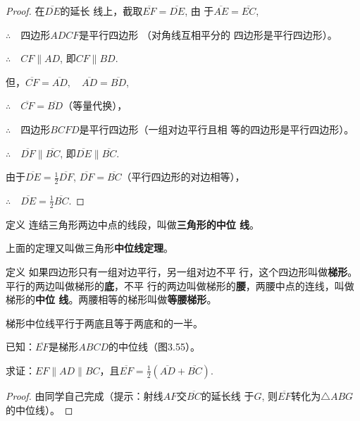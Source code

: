 \begin{proof}
 在$\overline{DE}$的延长
线上，截取$\overline{EF}=\overline{DE}$, 由
于$\overline{AE}=\overline{EC}$, 

$\therefore\quad $四边形$ADCF$是平行四边形
（对角线互相平分的
四边形是平行四边形）。

$\therefore\quad CF\parallel AD$, 即$CF\parallel BD$.

但，$\overline{CF}=\overline{AD},\quad \overline{AD}=\overline{BD}$,

$\therefore\quad \overline{CF}=\overline{BD}$（等量代换），

$\therefore\quad $四边形$BCFD$是平行四边形（一组对边平行且相
等的四边形是平行四边形）。

$\therefore\quad \overline{DF}\parallel \overline{BC}$, 即$\overline{DE}\parallel \overline{BC}$.

由于$\overline{DE}=\frac{1}{2}\overline{DF}$, $\overline{DF}=\overline{BC}$（平行四边形的对边相等），

$\therefore\quad \overline{DE}=\frac{1}{2}\overline{BC}$.
\end{proof}

\begin{blk}
    {定义}
连结三角形两边中点的线段，叫做\textbf{三角形的中位
线}。
\end{blk}

上面的定理又叫做三角形\textbf{中位线定理}。

\begin{blk}
    {定义} 如果四边形只有一组对边平行，另一组对边不平
行，这个四边形叫做\textbf{梯形}。平行的两边叫做梯形的\textbf{底}，不平
行的两边叫做梯形的\textbf{腰}，两腰中点的连线，叫做梯形的\textbf{中位
线}。两腰相等的梯形叫做\textbf{等腰梯形}。
\end{blk}

\begin{example}
    梯形中位线平行于两底且等于两底和的一半。
\end{example}

已知：$\overline{EF}$是梯形$ABCD$的中位线（图3.55）。

求证：$EF\parallel AD\parallel BC$，且$\overline{EF}=\frac{1}{2}(\overline{AD}+\overline{BC})$.

\begin{proof}
由同学自己完成（提示：射线$AF$交$\overline{BC}$的延长线
    于$G$, 则$\overline{EF}$转化为$\triangle ABG$的中位线）。
\end{proof}

